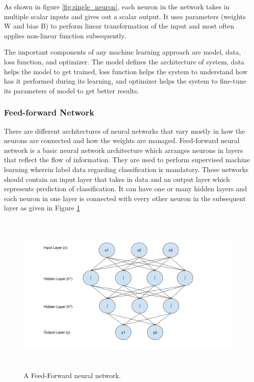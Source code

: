 \documentclass[a4paper, 11pt]{article}
\begin{document}
As shown in figure \ref{fig:single_neuron}, each neuron in the network takes in multiple scalar inputs and gives out a scalar output. It uses parameters (weights W and bias B) to perform linear transformation of the input and most often applies non-linear function subsequently.

The important components of any machine learning approach are model, data, loss function, and optimizer. The model defines the architecture of system, data helps the model to get trained, loss function helps the system to understand how has it performed during its learning, and optimizer helps the system to fine-tune its parameters of model to get better results.

\subsubsection{Feed-forward Network}

There are different architectures of neural networks that vary mostly in how the neurons are connected and how the weights are managed. Feed-forward neural network \parencite{Svozil1997} is a basic neural network architecture which arranges neurons in layers that reflect the flow of information. They are used to perform supervised machine learning wherein label data regarding classification is mandatory. These networks should contain an input layer that takes in data and an output layer which represents prediction of classification. It can have one or many hidden layers and each neuron in one layer is connected with every other neuron in the subsequent layer as given in Figure \ref{fig:Feed forward neural network}

\begin{figure}[htpb]
    \centering
    \includegraphics[width=\textwidth,height=8cm,keepaspectratio=true]
    {feed-forward-neural-network.png}
    \caption{
        A Feed-Forward neural network.
    }
    \label{fig:Feed forward neural network}
\end{figure}
\end{document}
